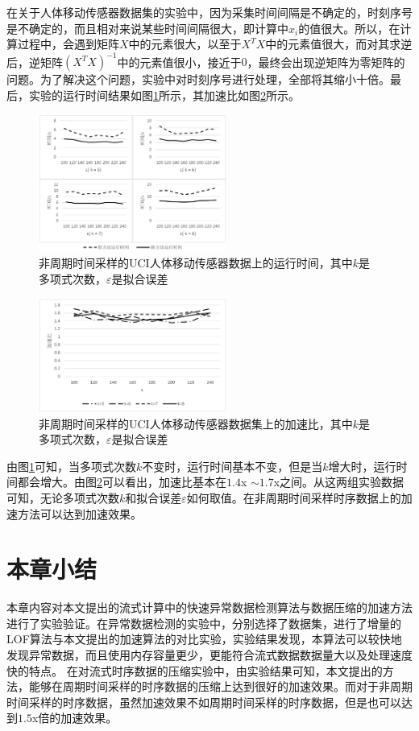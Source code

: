 在关于人体移动传感器数据集的实验中，因为采集时间间隔是不确定的，时刻序号是不确定的，而且相对来说某些时间间隔很大，即计算中$x_i$的值很大。所以，在计算过程中，会遇到矩阵$X$中的元素很大，以至于$X^TX$中的元素值很大，而对其求逆后，逆矩阵$(X^TX)^{-1}$中的元素值很小，接近于$0$，最终会出现逆矩阵为零矩阵的问题。为了解决这个问题，实验中对时刻序号进行处理，全部将其缩小十倍。最后，实验的运行时间结果如图\ref{fig:fig629}所示，其加速比如图\ref{fig:fig6210}所示。

\begin{figure}[htb]
	\centering
	\includegraphics[width=0.55\textwidth]{figures/figure62x9Asen}
	\caption{非周期时间采样的UCI人体移动传感器数据上的运行时间，其中$k$是多项式次数，$\varepsilon$是拟合误差}\label{fig:fig629}
\end{figure}

\begin{figure}[htb]
	\centering
	\includegraphics[width=0.55\textwidth]{figures/figure62x10Asen}
	\caption{非周期时间采样的UCI人体移动传感器数据集上的加速比，其中$k$是多项式次数，$\varepsilon$是拟合误差}\label{fig:fig6210}
\end{figure}

由图\ref{fig:fig629}可知，当多项式次数$k$不变时，运行时间基本不变，但是当$k$增大时，运行时间都会增大。由图\ref{fig:fig6210}可以看出，加速比基本在$1.4$x $\sim 1.7$x之间。从这两组实验数据可知，无论多项式次数$k$和拟合误差$\varepsilon$如何取值。在非周期时间采样时序数据上的加速方法可以达到加速效果。   

\section{本章小结} 
本章内容对本文提出的流式计算中的快速异常数据检测算法与数据压缩的加速方法进行了实验验证。在异常数据检测的实验中，分别选择了数据集，进行了增量的LOF算法与本文提出的加速算法的对比实验，实验结果发现，本算法可以较快地发现异常数据，而且使用内存容量更少，更能符合流式数据数据量大以及处理速度快的特点。  在对流式时序数据的压缩实验中，由实验结果可知，本文提出的方法，能够在周期时间采样的时序数据的压缩上达到很好的加速效果。而对于非周期时间采样的时序数据，虽然加速效果不如周期时间采样的时序数据，但是也可以达到$1.5$x倍的加速效果。                                    